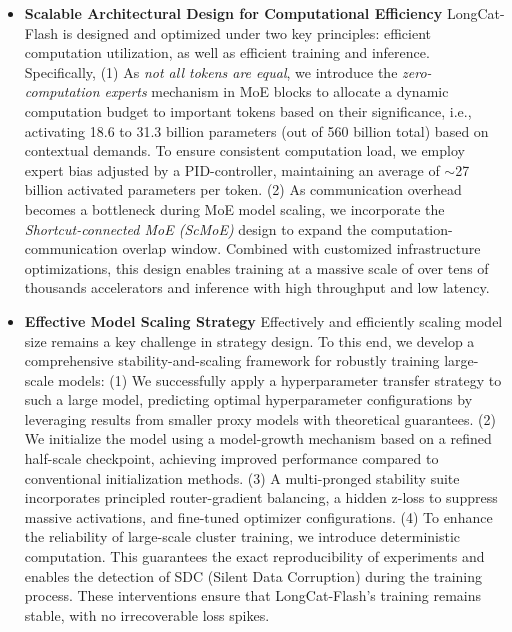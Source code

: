 \documentclass{article}
\newcommand{\longcat}{LongCat-Flash\xspace}
\newcommand{\chip}{accelerators\xspace}
\begin{document}
\begin{itemize}

\item \textbf{Scalable Architectural Design for Computational Efficiency} \longcat is designed and optimized under two key principles: efficient computation utilization, as well as efficient training and inference. Specifically, (1) As \textit{not all tokens are equal}, we introduce the \textit{zero-computation experts} mechanism in MoE blocks to allocate a dynamic computation budget to important tokens based on their significance, i.e., activating 18.6 to 31.3 billion parameters (out of 560 billion total) based on contextual demands. To ensure consistent computation load, we employ expert bias adjusted by a PID-controller, maintaining an average of $\sim$27 billion activated parameters per token. (2) As communication overhead becomes a bottleneck during MoE model scaling, we incorporate the \textit{Shortcut-connected MoE (ScMoE)} \citep{cai2024shortcut} design to expand the computation-communication overlap window. Combined with customized infrastructure optimizations, this design  enables training at a massive scale of over tens of thousands \chip and inference with high throughput and low latency.



\item \textbf{Effective Model Scaling Strategy} Effectively and efficiently scaling model size remains a key challenge in strategy design. To this end, we develop a comprehensive stability-and-scaling framework for robustly training large-scale models: (1) We successfully apply a hyperparameter transfer strategy to such a large model, predicting optimal hyperparameter configurations by leveraging results from smaller proxy models with theoretical guarantees. (2) We initialize the model using a model-growth mechanism based on a refined half-scale checkpoint, achieving improved performance compared to conventional initialization methods. (3) A multi-pronged stability suite incorporates principled router-gradient balancing, a hidden z-loss to suppress massive activations, and fine-tuned optimizer configurations. (4) To enhance the reliability of large-scale cluster training, we introduce deterministic computation. This guarantees the exact reproducibility of experiments and enables the detection of SDC (Silent Data Corruption) during the training process. These interventions ensure that \longcat’s training remains stable, with no irrecoverable loss spikes.



\end{itemize}
\end{document}
